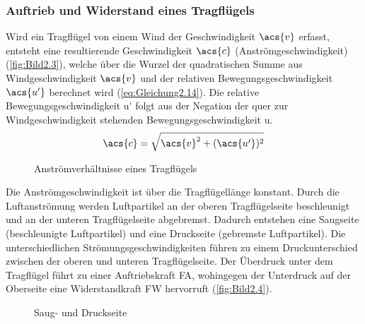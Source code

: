 \subsubsection{Auftrieb und Widerstand eines Tragflügels}
Wird ein Tragflügel von einem Wind der Geschwindigkeit $\acs{v}$ erfasst, entsteht eine resultierende Geschwindigkeit $\acs{c}$ (Anströmgeschwindigkeit) (\autoref{fig:Bild2.3}), welche über die Wurzel der quadratischen Summe aus Windgeschwindigkeit $\acs{v}$ und der relativen Bewegungsgeschwindigkeit $\acs{u'}$ berechnet wird (\autoref{eq:Gleichung2.14}). Die relative Bewegungsgeschwindigkeit \acs{u'} folgt aus der Negation der quer zur Windgeschwindigkeit stehenden Bewegungsgeschwindigkeit \acs{u}.
\begin{align} \label{eq:Gleichung2.14}
    \acs{c} = \sqrt{\acs{v}^2 + (\acs{u'})^2}
\end{align}
\begin{figure}[H]
   \centering
   \caption[Anströmverhältnisse eines Tragflügels]{Anströmverhältnisse eines Tragflügels}
   \label{fig:Bild2.3}
\end{figure}

Die Anströmgeschwindigkeit ist über die Tragflügellänge konstant. Durch die Luftanströmung werden Luftpartikel an der oberen Tragflügelseite beschleunigt und an der unteren Tragflügelseite abgebremst. Dadurch entstehen eine Saugseite (beschleunigte Luftpartikel) und eine Druckseite (gebremste Luftpartikel). Die unterschiedlichen Strömungsgeschwindigkeiten führen zu einem Druckunterschied zwischen der oberen und unteren Tragflügelseite. Der Überdruck unter dem Tragflügel führt zu einer Auftriebskraft \acs{FA}, wohingegen der Unterdruck auf der Oberseite eine Widerstandkraft \acs{FW} hervorruft (\autoref{fig:Bild2.4}).
\begin{figure}[H]
   \centering
   \caption[Saug- und Druckseite]{Saug- und Druckseite}
   \label{fig:Bild2.4}
\end{figure}
\newpage
